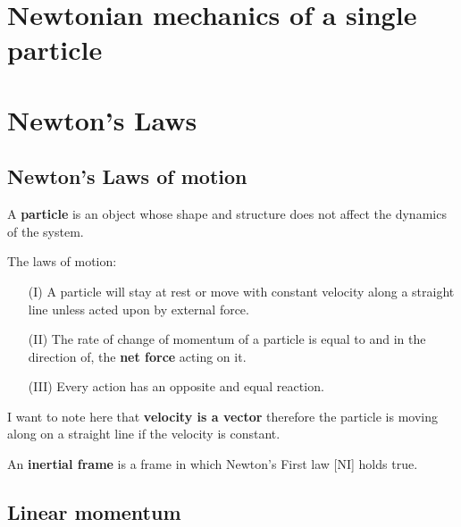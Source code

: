 \documentclass[12pt, a4paper]{article}
\begin{document}
\pagebreak

\section*{Newtonian mechanics of a single particle}

\section{Newton's Laws}

\subsection{Newton's Laws of motion}

\begin{definition}
    A \textbf{particle} is an object whose shape and structure does not affect the dynamics of the system.
\end{definition}

\begin{mdthm}
    The laws of motion:
    \begin{enumerate}
        \item[(I)] A particle will stay at rest or move with constant velocity along a straight line unless acted upon by external force.
        \item[(II)] The rate of change of momentum of a particle is equal to and in the direction of, the \textbf{net force} acting on it.
        \item[(III)] Every action has an opposite and equal reaction.
    \end{enumerate}
\end{mdthm}

\begin{mdnote}
    I want to note here that \textbf{velocity is a vector} therefore the particle is moving along on a straight line if the velocity is constant.
\end{mdnote}

\begin{definition}
    An \textbf{inertial frame} is a frame in which Newton's First law [NI] holds true.
\end{definition}

\subsection{Linear momentum}
\end{document}
